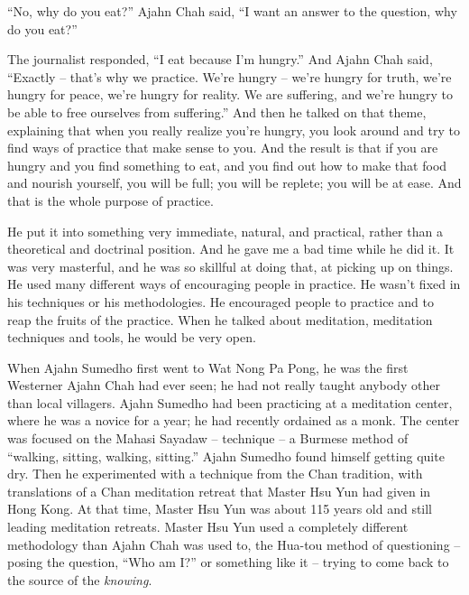 \documentclass[a4paper,portrait,12pt]{article}
\begin{document}
``No, why do you eat?'' Ajahn Chah said, ``I want an answer to the question, why do you eat?''  





The  journalist  responded,  ``I  eat  because  I'm hungry.'' And Ajahn  Chah  said,  ``Exactly  --  that's why  we  practice. We're  hungry  --  we're  hungry for  truth,  we're  hungry  for  peace,  we're  hungry for reality. We are suffering, and we're hungry to be able to free ourselves from suffering.'' And then he talked on that theme, explaining that when you really realize you're hungry, you look around and try  to  find  ways  of  practice  that  make  sense  to you. And the result is that if you are hungry and you find something to eat, and you find out how to make that food and nourish yourself, you will be  full;  you  will  be  replete;  you  will  be  at  ease.  And that is the whole purpose of practice.


 


He put it into something very immediate, natural, and   practical,
rather   than   a   theoretical   and doctrinal  position.  And  he
gave  me  a  bad  time while he did it. It was very masterful, and he
was so  skillful  at  doing  that,  at  picking up on  things.  He
used  many  different  ways  of  encouraging people   in   practice.
He   wasn't   fixed   in   his techniques or his methodologies. He
encouraged people  to  practice  and  to  reap  the  fruits  of  the
practice.  When   he   talked   about   meditation, meditation
techniques  and  tools,  he  would  be very open. 


 


When Ajahn Sumedho first went to Wat Nong Pa Pong, he was the first
Westerner Ajahn Chah had ever seen; he had not really taught anybody
other than  local  villagers.  Ajahn  Sumedho  had  been practicing
at  a  meditation  center,  where  he  was  a  novice  for  a  year;
he  had  recently  ordained  as  a  monk. The  center  was  focused
on  the  Mahasi Sayadaw  --  technique  --  a Burmese method of
``walking, sitting, walking, sitting.'' Ajahn Sumedho found
himself   getting   quite   dry.   Then   he experimented  with  a
technique  from  the  Chan tradition,  with  translations  of  a
Chan  meditation retreat  that  Master  Hsu Yun  had  given  in  Hong
Kong.  At  that  time,  Master  Hsu Yun  was  about 115 years old and
still leading meditation retreats.  Master   Hsu  Yun  used   a
completely   different methodology  than Ajahn  Chah  was  used  to,
the Hua-tou  method  of  questioning  --  posing  the question,
``Who  am  I?''  or  something  like  it  -- {\small trying to come
back to the source of the }\emph{{\small knowing}}{\small . }
\end{document}
